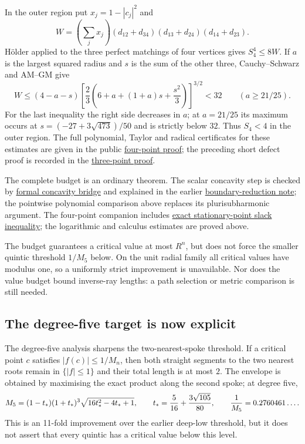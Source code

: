 \documentclass[11pt]{article}
\begin{document}
In the outer region put $x_j=1-|c_j|^2$ and
\[
 W=(\sum_jx_j)(d_{12}+d_{34})(d_{13}+d_{24})(d_{14}+d_{23}).
\]
Hölder applied to the three perfect matchings of four vertices gives
$S_4^4\le8W$.  If $a$ is the largest squared radius and $s$ is the sum
of the other three, Cauchy--Schwarz and AM--GM give
\[
 W\le(4-a-s)
 \left[\frac23\left(6+a+(1+a)s+\frac{s^2}{3}\right)\right]^{3/2}<32
 \qquad(a\ge21/25).
\]
For the last inequality the right side decreases in $a$; at $a=21/25$
its maximum occurs at $s=(-27+3\sqrt{473})/50$ and is strictly below $32$.
Thus $S_4<4$ in the outer region.  The full polynomial, Taylor and radical
certificates for these estimates are given in the public
\href{https://github.com/wcook04/plectis-erdos/blob/99f4bf47422abbd8757cbb22b50ba079d764d3a7/research_corpus/Erdos1041/FreePointZeroInsertionFP4Matching.md}{four-point proof};
the preceding short defect proof is recorded in the
\href{https://github.com/wcook04/plectis-erdos/blob/99f4bf47422abbd8757cbb22b50ba079d764d3a7/research_corpus/Erdos1041/FreePointMeanInequalityFP3.md}{three-point proof}.

The complete budget is an ordinary theorem.  The scalar concavity step
is checked by
\href{\repobase/research_corpus/Erdos1041/FreePointTorusPshReduction.lean\#L62}{formal concavity bridge}
and explained in the earlier
\href{https://github.com/wcook04/plectis-erdos/blob/99f4bf47422abbd8757cbb22b50ba079d764d3a7/research_corpus/Erdos1041/FreePointTorusPshReduction.md}{boundary-reduction note};
the pointwise polynomial comparison above replaces its plurisubharmonic
argument.  The four-point companion includes
\href{\repobase/research_corpus/Erdos1041/FreePointFP4Complete.lean\#L69}{exact stationary-point slack inequality};
the logarithmic and calculus estimates are proved above.

The budget guarantees a critical value at most $R^n$, but does not force
the smaller quintic threshold $1/M_5$ below.  On the unit radial family all
critical values have modulus one, so a uniformly strict improvement is
unavailable.  Nor does the value budget bound inverse-ray lengths: a path
selection or metric comparison is still needed.

\subsection*{The degree-five target is now explicit}

The degree-five analysis sharpens the two-nearest-spoke threshold.  If a
critical point $c$ satisfies $|f(c)|\le1/M_n$, then both straight segments to
the two nearest roots remain in $\{|f|\le1\}$ and their total length is at
most $2$.  The envelope is obtained by maximising the exact product along the
second spoke; at degree five,
\[
 M_5=(1-t_*)(1+t_*)^3\sqrt{16t_*^2-4t_*+1},
 \qquad
 t_*={5\over16}+{3\sqrt{105}\over80},
 \qquad
 {1\over M_5}=0.2760461\ldots.
\]
This is an 11-fold improvement over the earlier deep-low threshold, but it
does not assert that every quintic has a critical value below this level.
\end{document}
